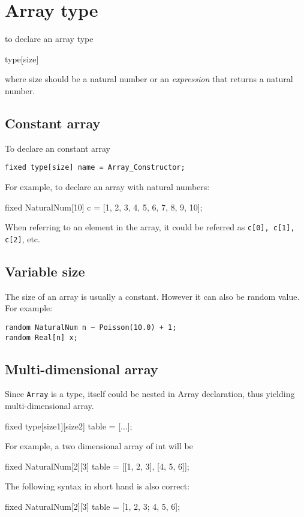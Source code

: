 \documentclass[12pt]{article}
\begin{document}
\section{Array type}
to declare an array type
\begin{blog}
type[size]
\end{blog}
 where size should be a natural number or an \emph{expression} that returns a natural number.

\subsection{Constant array}
To declare an constant array
\begin{verbatim}
fixed type[size] name = Array_Constructor;
\end{verbatim}

For example, to declare an array with natural numbers:
\begin{blog}
fixed NaturalNum[10] c = [1, 2, 3, 4, 5, 6, 7, 8, 9, 10];
\end{blog}

When referring to an element in the array, it could be referred as \texttt{c[0], c[1], c[2]}, etc.

\subsection{Variable size}
The size of an array is usually a constant. However it can also be random value.
For example:
\begin{verbatim}
random NaturalNum n ~ Poisson(10.0) + 1;
random Real[n] x;
\end{verbatim}

\subsection{Multi-dimensional array}
Since \texttt{Array} is a type, itself could be nested in Array declaration, thus yielding multi-dimensional array. 
\begin{blog}
fixed type[size1][size2] table = [...];
\end{blog}

For example, a two dimensional array of int will be
\begin{blog}
fixed NaturalNum[2][3] table = [[1, 2, 3], [4, 5, 6]];
\end{blog}
The following syntax in short hand is also correct:
\begin{blog}
fixed NaturalNum[2][3] table = [1, 2, 3; 4, 5, 6];
\end{blog}
\end{document}

